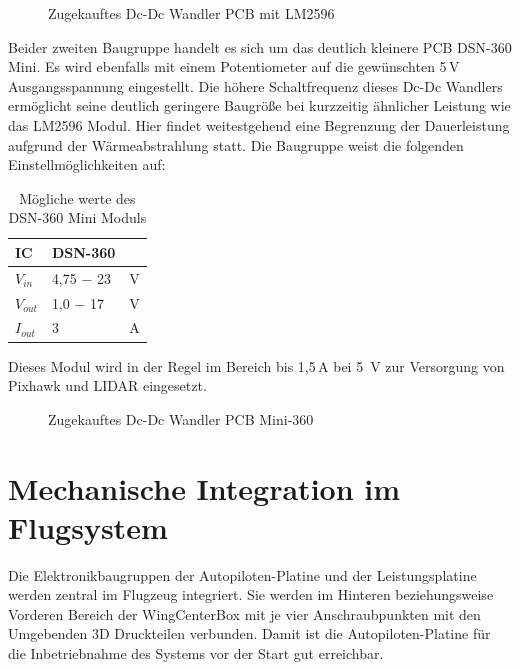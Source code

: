 \begin{figure}[H]
\centering
{}
\caption{Zugekauftes Dc-Dc Wandler PCB mit LM2596} 
\label{fig:Zugekauftes Dc-Dc Wandler PCB mit LM2596}
\end{figure}

Beider zweiten Baugruppe handelt es sich um das deutlich kleinere PCB DSN-360 Mini.
Es wird ebenfalls mit einem Potentiometer auf die gewünschten 5\,V Ausgangsspannung eingestellt. Die höhere Schaltfrequenz dieses Dc-Dc Wandlers ermöglicht seine deutlich geringere Baugröße bei kurzzeitig ähnlicher Leistung wie das LM2596 Modul. Hier findet weitestgehend eine Begrenzung der Dauerleistung aufgrund der Wärmeabstrahlung statt.
Die Baugruppe weist die folgenden Einstellmöglichkeiten auf:

\begin{table}[h]
\centering
\begin{tabular}{|l|l|l|}
\hline
IC    & DSN-360    &   \\ \hline
$V_{in}$  & 4,75 $-$ 23 & V \\ \hline
$V_{out}$ & 1,0 $-$ 17  & V \\ \hline
$I_{out}$ & 3         & A \\ \hline
\end{tabular}
\caption{Mögliche werte des DSN-360 Mini Moduls}
\label{Mögliche werte des DSN-360 Mini Moduls}
\end{table}

Dieses Modul wird in der Regel im Bereich bis 1,5\,A bei 5 \,V zur Versorgung von Pixhawk und LIDAR eingesetzt.

\begin{figure}[H]
\centering
{}
\caption{Zugekauftes Dc-Dc Wandler PCB Mini-360} 
\label{fig:Zugekauftes Dc-Dc Wandler PCB Mini-360}
\end{figure}

\section{Mechanische Integration im Flugsystem}

Die Elektronikbaugruppen der Autopiloten-Platine und der Leistungsplatine werden zentral im Flugzeug integriert. Sie werden im Hinteren beziehungsweise Vorderen Bereich der WingCenterBox mit je vier Anschraubpunkten mit den Umgebenden 3D Druckteilen verbunden.
Damit ist die Autopiloten-Platine für die Inbetriebnahme des Systems vor der Start gut erreichbar.

